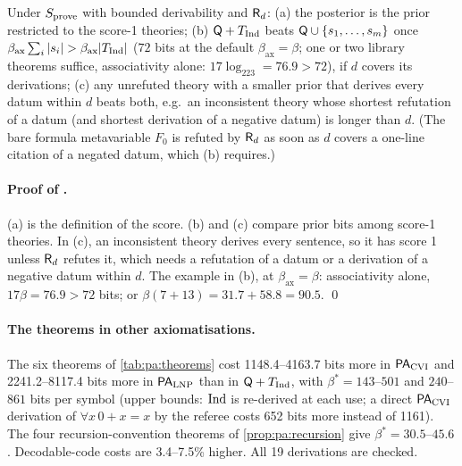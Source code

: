 \begin{proposition}\pabrk{}\label{prop:pa:must}
Under $S_{\mathrm{prove}}$ with bounded derivability and $\mathsf{R}_{d}$: (a) the posterior is the prior restricted to the score-1 theories; (b) $\mathsf{Q}+T_{\mathrm{Ind}}$ beats $\mathsf{Q}\cup\{s_1,\dots,s_m\}$ once $\beta_{\mathrm{ax}}\sum_i|s_i|>\beta_{\mathrm{ax}}|\TInd|$ ($72$ bits at the default $\beta_{\mathrm{ax}}=\beta$; one or two library theorems suffice, associativity alone: $17\log_223=76.9>72$), if $d$ covers its derivations; (c) any unrefuted theory with a smaller prior that derives every datum within $d$ beats both, e.g.\ an inconsistent theory whose shortest refutation of a datum (and shortest derivation of a negative datum) is longer than $d$. (The bare formula metavariable $F_0$ is refuted by $\mathsf{R}_{d}$ as soon as $d$ covers a one-line citation of a negated datum, which (b) requires.)
\end{proposition}

\paragraph{Proof of .} (a) is the definition of the score. (b) and (c) compare prior bits among score-1 theories. In (c), an inconsistent theory derives every sentence, so it has score 1 unless $\mathsf{R}_{d}$ refutes it, which needs a refutation of a datum or a derivation of a negative datum within $d$. The example in (b), at $\beta_{\mathrm{ax}}=\beta$: associativity alone, $17\beta=76.9>72$ bits; or $\beta(7+13)=31.7+58.8=90.5$. \qed

\paragraph{The theorems in other axiomatisations.} The six theorems of \cref{tab:pa:theorems} cost 1148.4--4163.7 bits more in $\mathsf{PA}_{\mathrm{CVI}}$ and 2241.2--8117.4 bits more in $\mathsf{PA}_{\mathrm{LNP}}$ than in $\mathsf{Q}+T_{\mathrm{Ind}}$, with $\beta^*=143$--$501$ and $240$--$861$ bits per symbol (upper bounds: $\mathrm{Ind}$ is re-derived at each use; a direct $\mathsf{PA}_{\mathrm{CVI}}$ derivation of $\forall x\,0+x=x$ by the referee costs 652 bits more instead of 1161). The four recursion-convention theorems of \cref{prop:pa:recursion} give $\beta^*=30.5$--$45.6$. Decodable-code costs are 3.4--7.5\% higher. All 19 derivations are checked.

